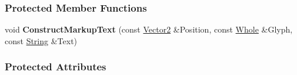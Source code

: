 \subsubsection*{Protected Member Functions}
\begin{DoxyCompactItemize}
\item 
\hypertarget{classphys_1_1UI_1_1MarkupText_a30fdf650958fddab91caed23a36066b5}{
void {\bfseries ConstructMarkupText} (const \hyperlink{classphys_1_1Vector2}{Vector2} \&Position, const \hyperlink{namespacephys_a460f6bc24c8dd347b05e0366ae34f34a}{Whole} \&Glyph, const \hyperlink{namespacephys_aa03900411993de7fbfec4789bc1d392e}{String} \&Text)}
\label{d7/d23/classphys_1_1UI_1_1MarkupText_a30fdf650958fddab91caed23a36066b5}

\end{DoxyCompactItemize}
\subsubsection*{Protected Attributes}
